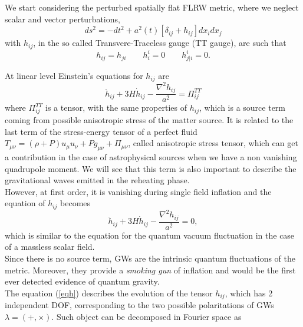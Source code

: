 \documentclass[11pt,a4paper,twoside]{book}
\begin{document}
We start considering the perturbed spatially flat FLRW metric, where we neglect scalar and vector perturbations,
\begin{equation}
	ds^{2} = -dt^{2} + a^{2}(t)[\delta_{ij} + h_{ij}]dx_{i}dx_{j}
\end{equation}
with $ h_{ij} $, in the so called Transvere-Traceless gauge (TT gauge), are such that
\begin{equation}
	h_{ij}=h_{ji} \qquad h^{i}_{i}=0 \qquad h^{i}_{j|i} = 0.
\end{equation}
 
 At linear level Einstein's equations for $ h_{ij} $ are 
 \begin{equation}
 	\ddot{h}_{ij} + 3H\dot{h}_{ij} - \frac{\nabla^{2}h_{ij}}{a^{2}}= \Pi^{TT}_{ij}
 \end{equation}
where $\Pi^{TT}_{ij}$ is a tensor, with the same properties of $ h_{ij} $, which is a source term coming from possible anisotropic stress of the matter source. It is related  to the last term of the stress-energy tensor of a perfect fluid $ T_{\mu\nu} = (\rho + P)u_{\mu}u_{\nu} + Pg_{\mu\nu} + \Pi_{\mu\nu}$, called anisotropic stress tensor, which can get a contribution in the case of astrophysical sources when we have a non vanishing quadrupole moment. We will see that this term is also important to describe the gravitational waves emitted in the reheating phase.\\
However, at first order, it is vanishing during single field inflation and the equation of $ h_{ij} $ becomes 
\begin{equation}
	\label{eqh}
		\ddot{h}_{ij} + 3H\dot{h}_{ij} - \frac{\nabla^{2}h_{ij}}{a^{2}}=0,
\end{equation}
which is similar to the equation for the quantum vacuum fluctuation in the case of a massless scalar field.\\
Since there is no source term, GWs are the intrinsic quantum fluctuations of the metric. Moreover, they provide a \textit{smoking gun} of inflation and would be the first ever detected evidence of quantum gravity.\\
The equation (\ref{eqh}) describes the evolution of the tensor $ h_{ij} $, which has 2 independent DOF, corresponding to the two possible polaritations of GWs $ \lambda = (+,\times) $. Such object can be decomposed in Fourier space as 
\end{document}
